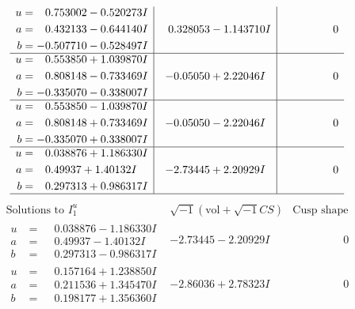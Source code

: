 \documentclass[1p]{elsarticle_modified}
\theoremstyle{definition}
\newcommand{\I}{\sqrt{-1}}
\begin{document}
$$\begin{array}{c|c|c}
\begin{aligned}
u &= \phantom{-}0.753002 - 0.520273 I \\
a &= \phantom{-}0.432133 - 0.644140 I \\
b &= -0.507710 - 0.528497 I\end{aligned}
 & \phantom{-}0.328053 - 1.143710 I & \phantom{-0.000000 } 0 \\ \hline\begin{aligned}
u &= \phantom{-}0.553850 + 1.039870 I \\
a &= \phantom{-}0.808148 - 0.733469 I \\
b &= -0.335070 - 0.338007 I\end{aligned}
 & -0.05050 + 2.22046 I & \phantom{-0.000000 } 0 \\ \hline\begin{aligned}
u &= \phantom{-}0.553850 - 1.039870 I \\
a &= \phantom{-}0.808148 + 0.733469 I \\
b &= -0.335070 + 0.338007 I\end{aligned}
 & -0.05050 - 2.22046 I & \phantom{-0.000000 } 0 \\ \hline\begin{aligned}
u &= \phantom{-}0.038876 + 1.186330 I \\
a &= \phantom{-}0.49937 + 1.40132 I \\
b &= \phantom{-}0.297313 + 0.986317 I\end{aligned}
 & -2.73445 + 2.20929 I & \phantom{-0.000000 } 0\\
 \hline 
 \end{array}$$\newpage$$\begin{array}{c|c|c}  
\text{Solutions to }I^u_{1}& \I (\text{vol} + \sqrt{-1}CS) & \text{Cusp shape}\\
 \hline 
\begin{aligned}
u &= \phantom{-}0.038876 - 1.186330 I \\
a &= \phantom{-}0.49937 - 1.40132 I \\
b &= \phantom{-}0.297313 - 0.986317 I\end{aligned}
 & -2.73445 - 2.20929 I & \phantom{-0.000000 } 0 \\ \hline\begin{aligned}
u &= \phantom{-}0.157164 + 1.238850 I \\
a &= \phantom{-}0.211536 + 1.345470 I \\
b &= \phantom{-}0.198177 + 1.356360 I\end{aligned}
 & -2.86036 + 2.78323 I & \phantom{-0.000000 } 0 \\ \hline\begin{aligned}

\end{aligned}
\end{array}$$
\end{document}
